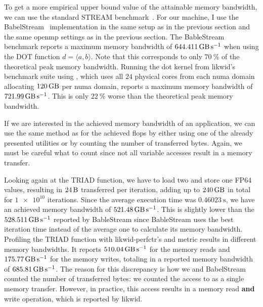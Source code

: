 To get a more empirical upper bound value of the attainable memory bandwidth, we can use the standard STREAM benchmark~\cite{mccalpin_memory_1995}. 
For our machine, I use the BabelStream~\cite{deakin_evaluating_2018} implementation in the same setup as in the previous section and the same \gls{openmp} settings as in the previous section. 
The BableStream benchmark reports a maximum memory bandwidth of $\SI{644.411}{\giga\byte\per\second}$ when using the DOT function $d = \langle a, b \rangle$. 
Note that this corresponds to only $\SI{70}{\percent}$ of the theoretical peak memory bandwidth. 
Running the dot kernel from likwid's benchmark suite using , which uses all $\num{24}$ physical cores from each \gls{numa} domain allocating $\SI{120}{\giga\byte}$ per \gls{numa} domain, reports a maximum memory bandwidth of $\SI{721.99}{\giga\byte\per\second}$. 
This is only $\SI{22}{\percent}$ worse than the theoretical peak memory bandwidth. 

If we are interested in the achieved memory bandwidth of an application, we can use the same method as for the achieved \gls{flops} by either using one of the already presented utilities or by counting the number of transferred bytes. 
Again, we must be careful what to count since not all variable accesses result in a memory transfer. 

Looking again at the TRIAD function, we have to load two and store one FP64 values, resulting in $\SI{24}{\byte}$ transferred per iteration, adding up to $\SI{240}{\giga\byte}$ in total for $\num{1e10}$ iterations. 
Since the average execution time was $\SI{0.46023}{\second}$, we have an achieved memory bandwidth of $\SI{521.48}{\giga\byte\per\second}$. 
This is slightly lower than the $\SI{528.511}{\giga\byte\per\second}$ reported by BableStream since BableStream uses the best iteration time instead of the average one to calculate its memory bandwidth. 
Profiling the TRIAD function with likwid-perfctr's  and  metric results in different memory bandwidths. 
It reports $\SI{510.04}{\giga\byte\per\second}$ for the memory reads and $\SI{175.77}{\giga\byte\per\second}$ for the memory writes, totaling in a reported memory bandwidth of $\SI{685.81}{\giga\byte\per\second}$. 
The reason for this discrepancy is how we and BabelStream counted the number of transferred bytes: we counted the access to  as a single memory transfer. 
However, in practice, this access results in a memory read \textbf{and} write operation, which is reported by likwid. 

